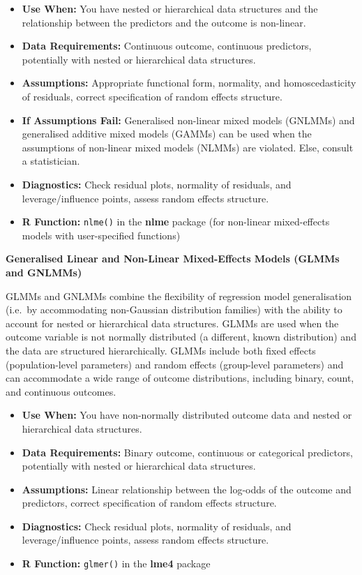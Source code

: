 \documentclass[
  letterpaper,
]{book}
\providecommand{\tightlist}{%
  \setlength{\itemsep}{0pt}\setlength{\parskip}{0pt}}\usepackage{longtable,booktabs,array}
\begin{document}
\begin{itemize}
\tightlist
\item
  \textbf{Use When:} You have nested or hierarchical data structures and
  the relationship between the predictors and the outcome is non-linear.
\item
  \textbf{Data Requirements:} Continuous outcome, continuous predictors,
  potentially with nested or hierarchical data structures.
\item
  \textbf{Assumptions:} Appropriate functional form, normality, and
  homoscedasticity of residuals, correct specification of random effects
  structure.
\item
  \textbf{If Assumptions Fail:} Generalised non-linear mixed models
  (GNLMMs) and generalised additive mixed models (GAMMs) can be used
  when the assumptions of non-linear mixed models (NLMMs) are violated.
  Else, consult a statistician.
\item
  \textbf{Diagnostics:} Check residual plots, normality of residuals,
  and leverage/influence points, assess random effects structure.
\item
  \textbf{R Function:} \texttt{nlme()} in the \textbf{nlme} package (for
  non-linear mixed-effects models with user-specified functions)
\end{itemize}

\textbf{Generalised Linear and Non-Linear Mixed-Effects Models (GLMMs
and GNLMMs)}

GLMMs and GNLMMs combine the flexibility of regression model
generalisation (i.e.~by accommodating non-Gaussian distribution
families) with the ability to account for nested or hierarchical data
structures. GLMMs are used when the outcome variable is not normally
distributed (a different, known distribution) and the data are
structured hierarchically. GLMMs include both fixed effects
(population-level parameters) and random effects (group-level
parameters) and can accommodate a wide range of outcome distributions,
including binary, count, and continuous outcomes.

\begin{itemize}
\tightlist
\item
  \textbf{Use When:} You have non-normally distributed outcome data and
  nested or hierarchical data structures.
\item
  \textbf{Data Requirements:} Binary outcome, continuous or categorical
  predictors, potentially with nested or hierarchical data structures.
\item
  \textbf{Assumptions:} Linear relationship between the log-odds of the
  outcome and predictors, correct specification of random effects
  structure.
\item
  \textbf{Diagnostics:} Check residual plots, normality of residuals,
  and leverage/influence points, assess random effects structure.
\item
  \textbf{R Function:} \texttt{glmer()} in the \textbf{lme4} package
\end{itemize}
\end{document}
